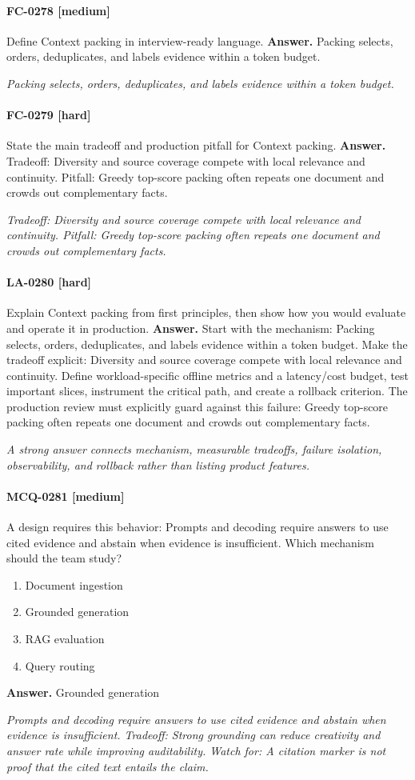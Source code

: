 \paragraph{FC-0278 [medium]} Define Context packing in interview-ready language.
\noindent\textbf{Answer.} Packing selects, orders, deduplicates, and labels evidence within a token budget.
\par\textit{Packing selects, orders, deduplicates, and labels evidence within a token budget.}
\paragraph{FC-0279 [hard]} State the main tradeoff and production pitfall for Context packing.
\noindent\textbf{Answer.} Tradeoff: Diversity and source coverage compete with local relevance and continuity. Pitfall: Greedy top-score packing often repeats one document and crowds out complementary facts.
\par\textit{Tradeoff: Diversity and source coverage compete with local relevance and continuity. Pitfall: Greedy top-score packing often repeats one document and crowds out complementary facts.}
\paragraph{LA-0280 [hard]} Explain Context packing from first principles, then show how you would evaluate and operate it in production.
\noindent\textbf{Answer.} Start with the mechanism: Packing selects, orders, deduplicates, and labels evidence within a token budget. Make the tradeoff explicit: Diversity and source coverage compete with local relevance and continuity. Define workload-specific offline metrics and a latency/cost budget, test important slices, instrument the critical path, and create a rollback criterion. The production review must explicitly guard against this failure: Greedy top-score packing often repeats one document and crowds out complementary facts.
\par\textit{A strong answer connects mechanism, measurable tradeoffs, failure isolation, observability, and rollback rather than listing product features.}
\paragraph{MCQ-0281 [medium]} A design requires this behavior: Prompts and decoding require answers to use cited evidence and abstain when evidence is insufficient. Which mechanism should the team study?
\begin{enumerate}[label=\Alph*.]
\item Document ingestion
\item Grounded generation
\item RAG evaluation
\item Query routing
\end{enumerate}
\noindent\textbf{Answer.} Grounded generation
\par\textit{Prompts and decoding require answers to use cited evidence and abstain when evidence is insufficient. Tradeoff: Strong grounding can reduce creativity and answer rate while improving auditability. Watch for: A citation marker is not proof that the cited text entails the claim.}
